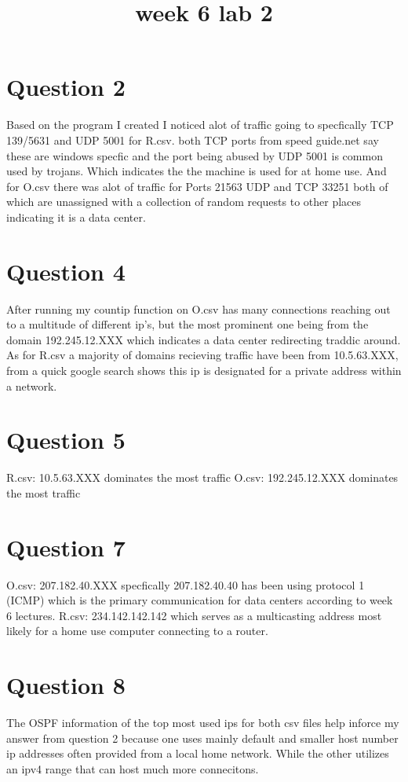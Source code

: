 \documentclass[letterpaper,12pt,titlepage,onecolumn]{IEEEtran}
\author{\name}
\title{week 6 lab 2}
\begin{document}
\maketitle
\hrulefill
\section{Question 2}
Based on the program I created I noticed alot of traffic going to specfically TCP 139/5631 and UDP 5001 for R.csv. both TCP ports from speed guide.net say these are windows specfic and the port being abused by UDP 5001 is common used by trojans. Which indicates the the machine is used for at home use. And for O.csv there was alot of traffic for Ports 21563 UDP and TCP 33251 both of which are unassigned with a collection of random requests to other places indicating it is a data center.

\section{Question 4}
After running my countip function on O.csv has many connections reaching out to a multitude of different ip's, but the most prominent one being from the domain 192.245.12.XXX which indicates a data center redirecting traddic around. As for R.csv a majority of domains recieving traffic have been from 10.5.63.XXX, from a quick google search shows this ip is designated for a private address within a network.

\section{Question 5}
R.csv: 10.5.63.XXX dominates the most traffic\newline
O.csv: 192.245.12.XXX dominates the most traffic\newline

\section{Question 7}
O.csv: 207.182.40.XXX specfically  207.182.40.40 has been using protocol 1 (ICMP) which is the primary communication for data centers according to week 6 lectures.\newline
R.csv: 234.142.142.142 which serves as a multicasting address most likely for a home use computer connecting to a router.

\section{Question 8}
The OSPF information of the top most used ips for both csv files help inforce my answer from question 2 because one uses mainly default and smaller host number ip addresses often provided from a local home network. While the other utilizes an ipv4 range that can host much more connecitons.
\end{document}
